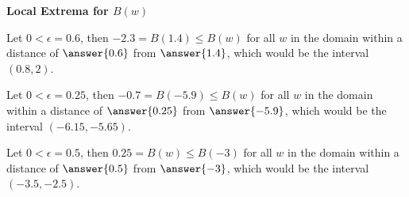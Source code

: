 \documentclass{ximera}
\begin{document}
\begin{explanation} \textbf{\textcolor{red!75!green}{Local Extrema for $B(w)$}} 

 

Let $0 < \epsilon = 0.6$, then   $-2.3 = B(1.4) \leq B(w)$ for all $w$ in the domain within a distance of $\answer{0.6}$ from $\answer{1.4}$, which would be the interval $(0.8, 2)$.

Let $0 < \epsilon = 0.25$, then   $-0.7 = B(-5.9) \leq B(w)$ for all $w$ in the domain within a distance of $\answer{0.25}$ from $\answer{-5.9}$, which would be the interval $(-6.15, -5.65)$.

Let $0 < \epsilon = 0.5$, then  $0.25 = B(w) \leq B(-3)$ for all $w$ in the domain within a distance of $\answer{0.5}$ from $\answer{-3}$, which would be the interval $(-3.5, -2.5)$.
\end{explanation}
\end{document}
